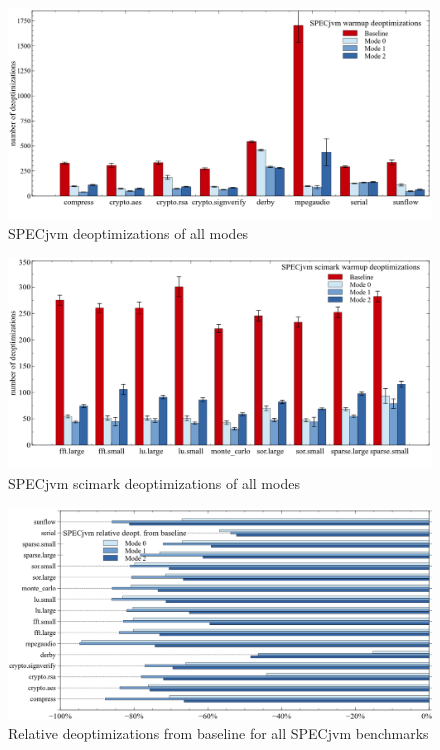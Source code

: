 \begin{figure}[ht]
  \begin{center}
    \centering
    \includegraphics[width=1.0\textwidth]{figures/others_warmup_deopt.png}
    \caption{SPECjvm deoptimizations of all modes}
    \label{f:others_warmup_deopt}
  \end{center}
\end{figure}

\begin{figure}[ht]
  \begin{center}
    \centering
    \includegraphics[width=1.0\textwidth]{figures/scimark_warmup_deopt.png}
    \caption{SPECjvm scimark deoptimizations of all modes}
    \label{f:scimark_warmup_deopt}
  \end{center}
\end{figure}

\begin{figure}[ht]
  \begin{center}
    \centering
    \includegraphics[width=1.0\textwidth]{figures/all_warmup_variation_deopt.png}
    \caption{Relative deoptimizations from baseline for all SPECjvm benchmarks}
    \label{f:all_warmup_variation_deopt}
  \end{center}
\end{figure}

